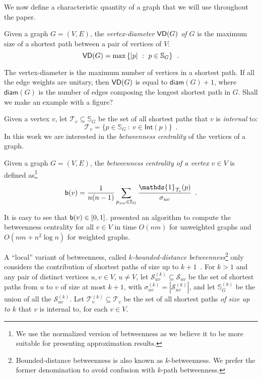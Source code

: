 We now define a characteristic quantity of a graph that we will use throughout
the paper.
\begin{definition}\label{def:vertexdiam}
  Given a graph $G=(V,E)$, the \emph{vertex-diameter $\mathsf{VD}(G)$ of $G$} is the
  maximum size of a shortest path between a pair of vertices of $V$:
  \[
  \mathsf{VD}(G) = \max\left\{|p| ~:~ p\in \mathbb{S}_G\right\}\enspace.\]
\end{definition}
The vertex-diameter is the maximum number of vertices in a shortest path. If all
the edge weights are unitary, then $\mathsf{VD}(G)$ is equal to $\mathsf{diam}(G)+1$,
where $\mathsf{diam}(G)$ is the number of edges composing the longest shortest
path in $G$. 
\XXX Shall we make an example with a figure?

Given a vertex $v$, let $\mathcal{T}_v\subseteq\mathbb{S}_G$ be the set of all
shortest paths that $v$ is \emph{internal} to:
\[
\mathcal{T}_v=\{p\in\mathbb{S}_G ~:~ v\in\mathsf{Int}(p)\}\enspace.
\]
In this work we are interested in the \emph{betweenness centrality} of the
vertices of a graph.

\begin{definition}\label{def:betwenness}
  \citep{Anthonisse71,Freeman77} Given a graph $G=(V,E)$, the \emph{betweenness
  centrality of a vertex $v\in V$} is defined as\footnote{We use the normalized
  version of betweenness as we believe it to be more suitable for presenting
  approximation results.}
  \[
  \betw(v)=\frac{1}{n(n-1)}\sum_{p_{uw}\in\mathbb{S}_G}\frac{\mathds{1}_{\mathcal{T}_v}(p)}{\sigma_{uv}}%
  \enspace.
  \]
\end{definition} 

It is easy to see that $\mathsf{b}(v)\in[0,1]$. \citet{Brandes01} presented an
algorithm to compute the betweenness centrality for all $v\in V$ in time
$O(nm)$ for unweighted graphs and $O(nm + n^2 \log n)$ for weighted graphs. 

A ``local'' variant of betweenness, called \emph{$k$-bounded-distance
betweenness}\footnote{Bounded-distance betweenness is also known as
$k$-betweenness. We prefer the former denomination to avoid confusion with
$k$-path betweenness.} only considers
the contribution of shortest paths of size up to $k+1$~\citep{BorgattiE06,Brandes08}.
For $k>1$ and any pair of distinct vertices $u,v\in V$, $u\neq V$, let
$\mathcal{S}^{(k)}_{uv}\subseteq\mathcal{S}_{uv}$ be the set of shortest paths
from $u$ to $v$ of size at most $k+1$, with
$\sigma^{(k)}_{uv}=|\mathcal{S}^{(k)}_{uv}|$, and let $\mathbb{S}^{(k)}_G$ be the
union of all the $\mathcal{S}^{(k)}_{uv}$. Let
$\mathcal{T}^{(k)}_v\subseteq\mathcal{T}_v$ be the set of all shortest paths
\emph{of size up to $k$} that $v$ is internal to, for each $v\in V$.

